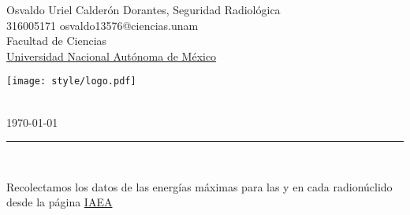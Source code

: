 

\pagestyle{fancy}
\fancyhf{}
\makeatletter
\def\@seccntformat#1{%
  \expandafter\ifx\csname c@#1\endcsname\c@section\else
  \csname the#1\endcsname\quad
  \fi}
\makeatother

\begin{flushleft}
Osvaldo Uriel Calderón Dorantes, \hfill Seguridad Radiológica\\
316005171 \hfill osvaldo13576@ciencias.unam  \\
Facultad de Ciencias\\
\underline{Universidad Nacional Autónoma de México}
\end{flushleft}

\begin{flushright}\vspace{-5mm}
\texttt{[image: style/logo.pdf]}
\end{flushright}
 
\begin{center}\vspace{-1cm}
\textbf{ \large {}}\\
\today
\end{center}
\medskip\hrule\bigskip

\newlength{\strutheight}
\settoheight{\strutheight}{\strut}

\begin{center}
  \textbf{ \large {}}\\
\end{center}

Recolectamos los datos de las energías máximas para las \ec{\beta} y \ec{\alpha} en cada radionúclido desde la página \href{https://www-nds.iaea.org/relnsd/vcharthtml/VChartHTML.html}{IAEA}

